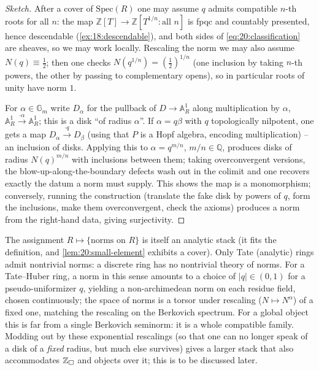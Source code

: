 \begin{proof}[Sketch]
After a cover of $\mathrm{Spec}(R)$ one may assume $q$ admits compatible $n$-th
roots for all $n$: the map $\mathbb Z[T]\to\mathbb Z[T^{1/n}:\text{all }n]$ is
fpqc and countably presented, hence descendable (\cref{ex:18:descendable}), and
both sides of \eqref{eq:20:classification} are sheaves, so we may work locally.
Rescaling the norm we may also assume $N(q)\equiv\tfrac12$; then one checks
$N(q^{1/n})=(\tfrac12)^{1/n}$ (one inclusion by taking $n$-th powers, the other by
passing to complementary opens), so in particular roots of unity have norm $1$.

For $\alpha\in\mathbb G_m$ write $D_\alpha$ for the pullback of $D\to
\mathbb A^1_R$ along multiplication by $\alpha$, $\mathbb A^1_R\xrightarrow{\cdot
\alpha}\mathbb A^1_R$; this is a disk ``of radius $\alpha$''. If $\alpha=q\beta$
with $q$ topologically nilpotent, one gets a map $D_\alpha\xrightarrow{\cdot q}
D_\beta$ (using that $P$ is a Hopf algebra, encoding multiplication) -- an
inclusion of disks. Applying this to $\alpha=q^{m/n}$, $m/n\in\mathbb Q$, produces
disks of radius $N(q)^{m/n}$ with inclusions between them; taking overconvergent
versions, the blow-up-along-the-boundary defects wash out in the colimit and one
recovers exactly the datum a norm must supply. This shows the map is a
monomorphism; conversely, running the construction (translate the fake disk by
powers of $q$, form the inclusions, make them overconvergent, check the axioms)
produces a norm from the right-hand data, giving surjectivity.
\end{proof}

\begin{remark}
\label{rmk:20:berkovich-relation}
The assignment $R\mapsto\{\text{norms on }R\}$ is itself an analytic stack (it
fits the definition, and \cref{lem:20:small-element} exhibits a cover). Only
Tate (analytic) rings admit nontrivial norms: a discrete ring has no nontrivial
theory of norms. For a Tate--Huber ring, a norm in this sense amounts to a
choice of $|q|\in(0,1)$ for a pseudo-uniformizer $q$, yielding a
non-archimedean norm on each residue field, chosen continuously; the space of
norms is a torsor under rescaling ($N\mapsto N^\alpha$) of a fixed one, matching
the rescaling on the Berkovich spectrum. For a global object this is far from a
single Berkovich seminorm: it is a whole compatible family. Modding out by these
exponential rescalings (so that one can no longer speak of a disk of a
\emph{fixed} radius, but much else survives) gives a larger stack that also
accommodates $\mathbb Z_\square$ and objects over it; this is to be discussed
later.
\end{remark}

